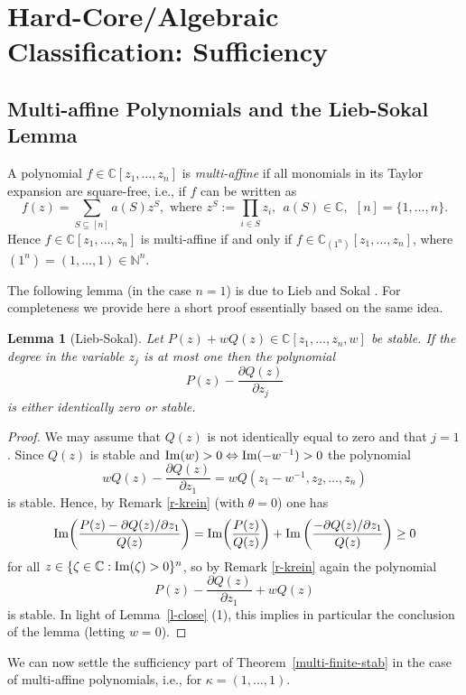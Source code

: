 \documentclass[10pt,reqno]{amsart}
\theoremstyle{plain}
\newtheorem{lemma}[theorem]{Lemma}
\theoremstyle{definition}
\theoremstyle{remark}
\numberwithin{equation}{section}
\newcommand{\NN}{\mathbb{N}}
\newcommand{\CC}{\mathbb{C}}
\renewcommand{\Im}{{\rm Im}}
\begin{document}
\section{Hard-Core/Algebraic Classification: Sufficiency}\label{s-6}

\subsection{Multi-affine Polynomials and the Lieb-Sokal Lemma}\label{s-5}
A polynomial $f \in \CC[z_1,\ldots, z_n]$ is {\em multi-affine} if all 
monomials in its Taylor expansion are square-free, i.e., if 
$f$ can be written as 
$$
f(z)= \sum_{S \subseteq [n]} a(S) z^S, \text{ where } 
z^S := \prod_{i \in S} z_i,\ \  a(S) \in \CC, \ \ [n]=\{1,\ldots,n\}. 
$$
Hence $f \in \CC[z_1,\ldots, z_n]$ is multi-affine if and only if 
$f \in \CC_{(1^n)}[z_1,\ldots, z_n]$, 
where $(1^n)=(1,\ldots, 1) \in \NN^n$. 

The following lemma (in the case $n=1$) is due to Lieb and Sokal 
\cite[Lemma~2.3]{LS}. For completeness we provide here a short proof 
essentially based on the same idea.
  
\begin{lemma}[Lieb-Sokal]\label{Li-So}
Let $P(z)+wQ(z) \in \CC[z_1,\ldots,z_n,w]$ be stable. 
If the degree in the variable $z_j$ is at most one then the polynomial 
$$
P(z)-\frac {\partial Q(z)}{\partial z_j}
$$
is either identically zero or stable. 
\end{lemma}

\begin{proof}
We may assume that $Q(z)$ is not identically equal to zero and 
that $j=1$. 
Since $Q(z)$ is stable and $\Im(w)>0\Leftrightarrow \Im(-w^{-1})>0$ 
the polynomial  
$$
wQ(z)-\frac{\partial Q(z)}{\partial z_1}
= wQ(z_1-w^{-1},z_2,\ldots, z_n)
$$ 
is stable. Hence, by Remark \ref{r-krein} (with $\theta=0$) one has
$$
\Im\!\left(\frac {P(z)-\partial Q(z)/\partial z_1}{Q(z)}\right) 
= \Im\!\left(\frac {P(z)}{Q(z)}\right) 
+ \Im\left(\frac {-\partial Q(z)/\partial z_1}{Q(z)}\right)  \geq 0
$$
for all $z \in \{\zeta \in \CC : \Im(\zeta)>0\}^n$, so by 
Remark \ref{r-krein} again the  
polynomial 
$$
P(z)-\frac{\partial Q(z)}{\partial z_1}+wQ(z)
$$
is stable. In light of Lemma~\ref{l-close} (1), this implies in particular 
the conclusion of the lemma (letting $w=0$).
\end{proof}

We can now settle the sufficiency part of Theorem~\ref{multi-finite-stab} 
in the
case of multi-affine polynomials, i.e., for $\kappa=(1,\ldots,1)$. 
\end{document}
